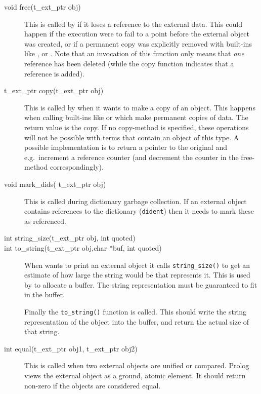 \begin{description}
\item[void free(t_ext_ptr obj)]
This is called by {\eclipse} if it loses a reference to the external
data. This could happen if the {\eclipse} execution were to fail
to a point before the external object was created, or if a
permanent copy was explicitly removed with built-ins like
,
or .
Note that an invocation of this function only means that {\em one}
reference has been deleted (while the copy function indicates that
a reference is added).

\item[t_ext_ptr copy(t_ext_ptr obj)]
This is called by {\eclipse} when it wants to make a copy of an object.
This happens when calling {\eclipse} built-ins like  or
 which make permanent copies of data. The return value is
the copy.
If no copy-method is specified, these operations will not be possible
with terms that contain an object of this type.
A possible implementation is to return a pointer to the original and
e.g.\ increment a reference counter (and decrement the counter in
the free-method correspondingly).

\item[void mark_dids( t_ext_ptr obj)]
This is called during dictionary garbage collection. If an external
object contains references to the dictionary (\verb.dident.) then
it needs to mark these as referenced.

\item[int string_size(t_ext_ptr obj, int quoted)]
\item[int to_string(t_ext_ptr obj,char *buf, int quoted)]
When {\eclipse} wants to print an external object it calls \verb.string_size().
to get an estimate of how large the string would be that represents it.
This is used by {\eclipse} to allocate a buffer. The string representation must
be guaranteed to fit in the buffer.

Finally  the \verb.to_string(). function is called. This should write the
string representation of the object into the buffer, and return the actual
size of that string.

\item[int equal(t_ext_ptr obj1, t_ext_ptr obj2)]
This is called when two external objects are unified or compared.
Prolog views the external object as a ground, atomic element.
It should return non-zero if the objects are considered equal.


\end{description}
